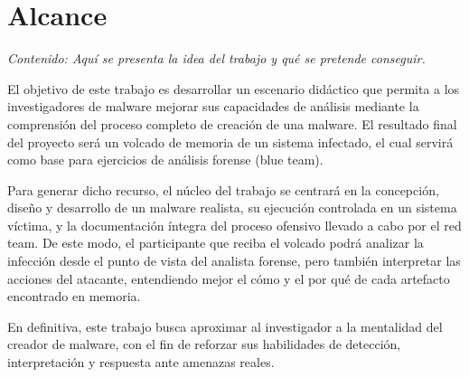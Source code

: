\chapter{Alcance}

\textit{Contenido: Aquí se presenta la idea del trabajo y qué se pretende conseguir.}
\vspace{1em}

El objetivo de este trabajo es desarrollar un escenario didáctico que permita a los
investigadores de malware mejorar sus capacidades de análisis mediante la comprensión
del proceso completo de creación de una malware. El resultado final del proyecto será
un volcado de memoria de un sistema infectado, el cual servirá como base para ejercicios
de análisis forense (blue team).

Para generar dicho recurso, el núcleo del trabajo se centrará en la concepción, diseño y
desarrollo de un malware realista, su ejecución controlada en un sistema víctima, y la
documentación íntegra del proceso ofensivo llevado a cabo por el red team. De este modo,
el participante que reciba el volcado podrá analizar la infección desde el punto de vista
del analista forense, pero también interpretar las acciones del atacante, entendiendo mejor
el cómo y el por qué de cada artefacto encontrado en memoria.

En definitiva, este trabajo busca aproximar al investigador a la mentalidad del creador de
malware, con el fin de reforzar sus habilidades de detección, interpretación y respuesta
ante amenazas reales.



